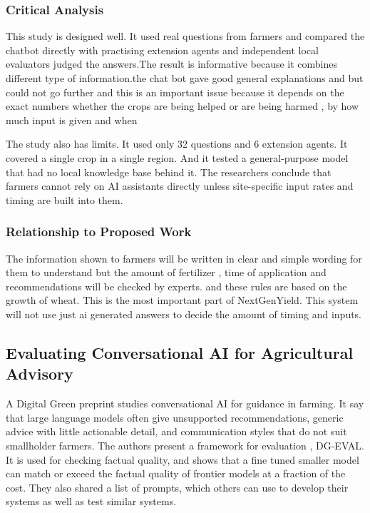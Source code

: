 \documentclass{FastFyp}
\begin{document}
\subsubsection{Critical Analysis}
This study is designed well. It used real questions from farmers and compared the chatbot directly with practising extension agents and independent local evaluators judged the answers.The result is informative because it combines different type of information.the chat bot gave good general explanations and but could not go further and this is an important issue because it depends on the exact numbers whether the crops are being helped or are being harmed , by how much input is given and when

The study also has limits. It used only 32 questions and 6 extension agents. It covered a single crop in a single region. And it tested a general-purpose model that had no local knowledge base behind it. The researchers conclude that farmers cannot rely on AI assistants directly unless site-specific input rates and timing are built into them.

\subsubsection{Relationship to Proposed Work}
The information shown to farmers will be written in clear and simple wording for them to understand but the amount of fertilizer , time of application and recommendations will be checked by experts. and these rules are based on the growth of wheat. This is the most important part of NextGenYield. This system will not use just ai generated answers to decide the amount of timing and inputs.


\subsection{Evaluating Conversational AI for Agricultural Advisory}

A Digital Green preprint \cite{ref:DigitalGreen:2026}  studies conversational AI for guidance in farming. It say that large language models often give unsupported recommendations, generic advice with little actionable detail, and communication styles that do not suit smallholder farmers. The authors present a framework for evaluation , DG-EVAL. It is used for checking factual quality, and shows that a fine tuned smaller model can match or exceed the factual quality of frontier models at a fraction of the cost. They also shared a list of prompts, which others can use to develop their systems as well as test similar systems.
\end{document}
